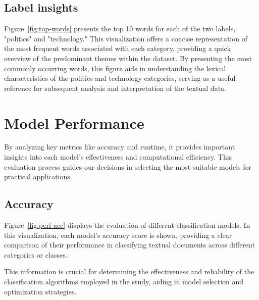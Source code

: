 \subsection{Label insights}


Figure~\ref{fig:top-words} presents the top 10 words for each of the two labels, "politics" and "technology." This visualization offers a concise representation of the most frequent words associated with each category, providing a quick overview of the predominant themes within the dataset. By presenting the most commonly occurring words, this figure aids in understanding the lexical characteristics of the politics and technology categories, serving as a useful reference for subsequent analysis and interpretation of the textual data.

\section{Model Performance}

By analyzing key metrics like accuracy and runtime, it provides important insights into each model's effectiveness and computational efficiency. This evaluation process guides our decisions in selecting the most suitable models for practical applications.



\subsection{Accuracy}


Figure~\ref{fig:perf-acc} displays the evaluation of different classification models. In this visualization, each model's accuracy score is shown, providing a clear comparison of their performance in classifying textual documents across different categories or classes.

This information is crucial for determining the effectiveness and reliability of the classification algorithms employed in the study, aiding in model selection and optimization strategies.

